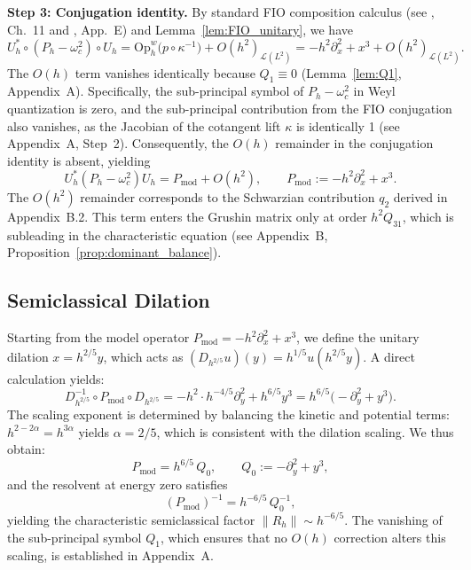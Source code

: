 \documentclass[12pt,a4paper]{amsart}
\theoremstyle{remark}
\begin{document}
\textbf{Step 3: Conjugation identity.}
By standard FIO composition calculus
(see \cite{Zworski2012}, Ch.~11 and \cite{DZ19}, App.~E)
and Lemma~\ref{lem:FIO_unitary}, we have
\[
  U_h^* \circ (P_h - \omega_c^2) \circ U_h
  = \mathrm{Op}^w_h\!\bigl(p \circ \kappa^{-1}\bigr) + O(h^2)_{\mathcal{L}(L^2)}
  = -h^2\partial_x^2 + x^3 + O(h^2)_{\mathcal{L}(L^2)}.
\]
The $O(h)$ term vanishes identically because $Q_1 \equiv 0$ (Lemma~\ref{lem:Q1}, Appendix~A).
Specifically, the sub-principal symbol of $P_h - \omega_c^2$ in Weyl quantization is zero,
and the sub-principal contribution from the FIO conjugation also vanishes, as the
Jacobian of the cotangent lift $\kappa$ is identically 1 (see Appendix~A, Step~2).
Consequently, the $O(h)$ remainder in the conjugation identity is absent, yielding
\begin{equation}\label{eq:BNF_conjugation}
  U_h^* (P_h - \omega_c^2) U_h = P_{\mathrm{mod}} + O(h^2), \qquad
  P_{\mathrm{mod}} := -h^2\partial_x^2 + x^3.
\end{equation}
The $O(h^2)$ remainder corresponds to the Schwarzian contribution $q_2$ derived in Appendix~B.2.
This term enters the Grushin matrix only at order $h^2 Q_{31}$, which is subleading
in the characteristic equation (see Appendix~B, Proposition~\ref{prop:dominant_balance}).

\subsection{Semiclassical Dilation}

Starting from the model operator $P_{\mathrm{mod}} = -h^2\partial_x^2 + x^3$, we define the
unitary dilation $x = h^{2/5}y$, which acts as $(D_{h^{2/5}}u)(y) = h^{1/5}u(h^{2/5}y)$.
A direct calculation yields:
\[
  D_{h^{2/5}}^{-1} \circ P_{\mathrm{mod}} \circ D_{h^{2/5}}
  = -h^2 \cdot h^{-4/5}\partial_y^2 + h^{6/5}y^3
  = h^{6/5}\bigl(-\partial_y^2 + y^3\bigr).
\]
The scaling exponent is determined by balancing the kinetic and potential terms:
$h^{2-2\alpha} = h^{3\alpha}$ yields $\alpha = 2/5$, which is consistent with the dilation scaling.
We thus obtain:
\[
  P_{\mathrm{mod}} = h^{6/5}\,Q_0, \qquad Q_0 := -\partial_y^2 + y^3,
\]
and the resolvent at energy zero satisfies
\[
  (P_{\mathrm{mod}})^{-1} = h^{-6/5}\,Q_0^{-1},
\]
yielding the characteristic semiclassical factor $\|R_h\| \sim h^{-6/5}$.
The vanishing of the sub-principal symbol $Q_1$, which ensures that no $O(h)$
correction alters this scaling, is established in Appendix~A.

\end{document}
